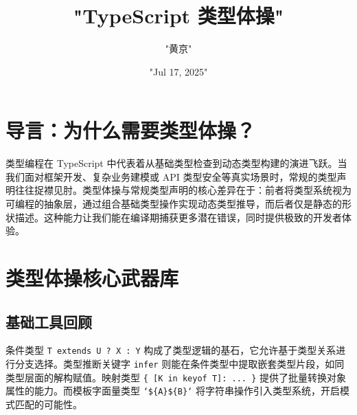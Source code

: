 \title{"TypeScript 类型体操"}
\author{"黄京"}
\date{"Jul 17, 2025"}
\maketitle
\chapter{导言：为什么需要类型体操？}
类型编程在 TypeScript 中代表着从基础类型检查到动态类型构建的演进飞跃。当我们面对框架开发、复杂业务建模或 API 类型安全等真实场景时，常规的类型声明往往捉襟见肘。类型体操与常规类型声明的核心差异在于：前者将类型系统视为可编程的抽象层，通过组合基础类型操作实现动态类型推导，而后者仅是静态的形状描述。这种能力让我们能在编译期捕获更多潜在错误，同时提供极致的开发者体验。\par
\chapter{类型体操核心武器库}
\section{基础工具回顾}
条件类型 \texttt{T extends U ? X : Y} 构成了类型逻辑的基石，它允许基于类型关系进行分支选择。类型推断关键字 \texttt{infer} 则能在条件类型中提取嵌套类型片段，如同类型层面的解构赋值。映射类型 \texttt{\{{} [K in keyof T]: ... \}{}} 提供了批量转换对象属性的能力。而模板字面量类型 \texttt{`\${}\{{}A\}{}\${}\{{}B\}{}`} 将字符串操作引入类型系统，开启模式匹配的可能性。\par
